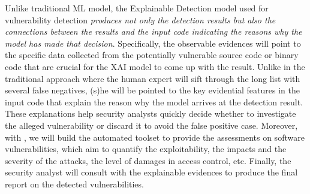 Unlike traditional ML model, the Explainable Detection model used for
vulnerability detection {\em produces not only the detection results
  but also the connections between the results and the input code
  indicating the reasons why the model has made that decision}.
Specifically, the observable evidences will point to the specific data
collected from the potentially vulnerable source code or binary code
that are crucial for the XAI model to come up with the result.
Unlike in the traditional approach where the human expert will sift
through the long list with several false negatives, (s)he will be
pointed to the key evidential features in the input code that explain
the reason why the model arrives at the detection result. These
explanations help security analysts quickly decide whether to
investigate the alleged vulnerability or discard it to avoid the false
positive case. Moreover, with {\tool}, we will build the
automated toolset to provide the assessments on software
vulnerabilities, which aim to quantify the exploitability, the impacts
and the severity of the attacks, the level of damages in access
control, etc. 
Finally, the security analyst will consult with the explainable
evidences to produce the final report on the detected vulnerabilities.


